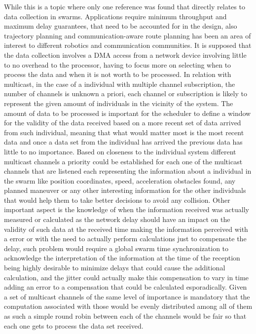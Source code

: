 \documentclass[journal]{IEEEtran}
\begin{document}
While this is a topic where only one reference was found that directly relates to data collection in swarms\cite{HH5}. Applications require minimum throughput and maximum delay guarantees, that need to be accounted for in the design, also trajectory planning  and communication-aware route planning has been an area of interest to different robotics and communication communities\cite{HH5}.
It is supposed that the data collection involves a DMA access from a network device involving little to no overhead to the processor, having to focus more on selecting when to process the data and when it is not worth to be processed.
In relation with multicast, in the case of a individual with multiple channel subscription, the number of channels is unknown a priori, each channel or subscription is likely to represent the given amount of individuals in the vicinity of the system. The amount of data to be processed is important for the scheduler to define a window for the validity of the data received based on a more recent set of data arrived from such individual, meaning that what would matter most is the most recent data and once a data set from the individual has arrived the previous data has little to no importance.
Based on closeness to the individual system different multicast channels a priority could be established for each one of the multicast channels that are listened each representing the information about a individual in the swarm like position coordinates, speed, acceleration obstacles found, any planned maneuver or any other interesting information for the other individuals that would help them to take better decisions to avoid any collision.
Other important aspect is the knowledge of when the information received was actually measured or calculated as the network delay should have an impact on the validity of such data at the received time making the information perceived with a error or with the need to actually perform calculations just to compensate the delay, such problem would require a global swarm time synchronization to acknowledge the interpretation of the information at the time of the reception being highly desirable to minimize delays that could cause the additional calculation, and the jitter could actually make this compensation to vary in time adding an error to a compensation that could be calculated esporadically\cite{HH6}.
Given a set of multicast channels of the same level of importance is mandatory that the computation associated with those would be evenly distributed among all of them as such a simple round robin between each of the channels would be fair so that each one gets to process the data set received.
\end{document}
